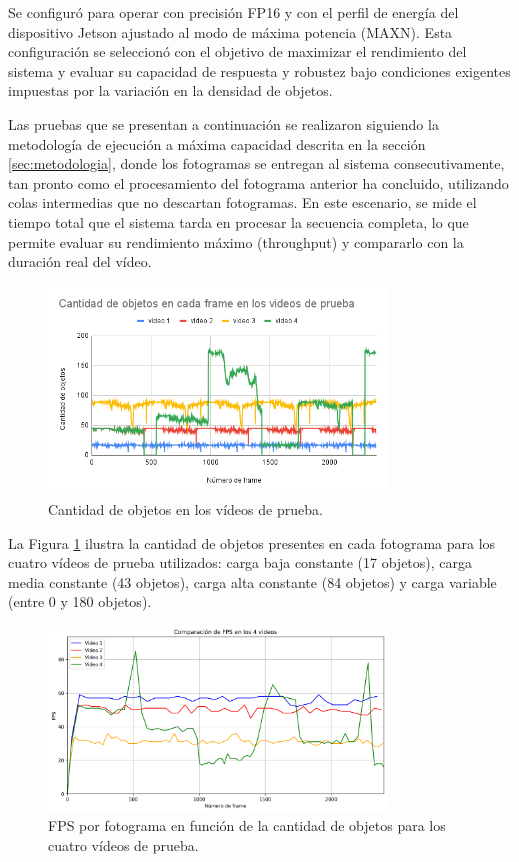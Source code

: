 \documentclass[11pt,spanish,listoffigures,listoftables]{tfgetsinf}
\begin{document}
Se configuró para operar con precisión FP16 y con el perfil de energía del dispositivo Jetson ajustado al modo de máxima potencia (MAXN). Esta configuración se seleccionó con el objetivo de maximizar el rendimiento del sistema y evaluar su capacidad de respuesta y robustez bajo condiciones exigentes impuestas por la variación en la densidad de objetos.

Las pruebas que se presentan a continuación se realizaron siguiendo la metodología de ejecución a máxima capacidad descrita en la sección \ref{sec:metodologia}, donde los fotogramas se entregan al sistema consecutivamente, tan pronto como el procesamiento del fotograma anterior ha concluido, utilizando colas intermedias que no descartan fotogramas. En este escenario, se mide el tiempo total que el sistema tarda en procesar la secuencia completa, lo que permite evaluar su rendimiento máximo (throughput) y compararlo con la duración real del vídeo.

\begin{figure}[H]
   \centering
   \includegraphics[width=0.8\textwidth]{images/analisis_de_la_solucion/cantidad_objetos/cantidad_objetos_4_videos.png}
   \caption{Cantidad de objetos en los vídeos de prueba.}
   \label{fig:4_videos}
\end{figure}

La Figura \ref{fig:4_videos} ilustra la cantidad de objetos presentes en cada fotograma para los cuatro vídeos de prueba utilizados: carga baja constante (17 objetos), carga media constante (43 objetos), carga alta constante (84 objetos) y carga variable (entre 0 y 180 objetos).

\begin{figure}[H]
   \centering
   \includegraphics[width=0.8\textwidth]{excels/inferencia/cantidad_objetos/resultados/max_fps_4_videos/fps_comparison.png}
   \caption{FPS por fotograma en función de la cantidad de objetos para los cuatro vídeos de prueba.}
   \label{fig:fps_por_frame}
\end{figure}
\end{document}
